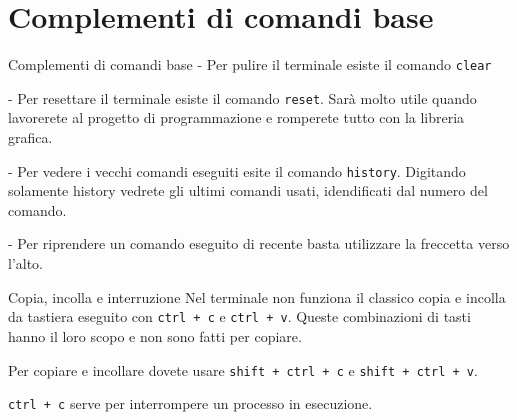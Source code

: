 \section{Complementi di comandi base}

\begin{frame}{Complementi di comandi base}
  - Per pulire il terminale esiste il comando \texttt{clear}\bigskip

  - Per resettare il terminale esiste il comando \texttt{reset}. Sarà molto utile
  quando lavorerete al progetto di programmazione e romperete tutto con 
  la libreria grafica.\bigskip

  - Per vedere i vecchi comandi eseguiti esite il comando \texttt{history}.
    Digitando solamente history vedrete gli ultimi comandi usati, idendificati 
    dal numero del comando. \bigskip

  - Per riprendere un comando eseguito di recente basta utilizzare la freccetta
  verso l'alto. \bigskip
\end{frame}

\begin{frame}{Copia, incolla e interruzione}
  Nel terminale non funziona il classico copia e incolla da tastiera eseguito
  con \texttt{ctrl + c} e \texttt{ctrl + v}. Queste combinazioni di tasti hanno 
  il loro scopo e non sono fatti per copiare.\bigskip

  Per copiare e incollare dovete usare \texttt{shift + ctrl + c} e 
  \texttt{shift + ctrl + v}.\bigskip

  \texttt{ctrl + c} serve per interrompere un processo in esecuzione.
\end{frame}